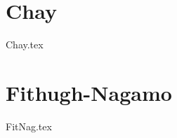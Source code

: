 \documentclass[../Orator.tex]{subfiles}
\begin{document}
\chapter{Chay}
{Chay.tex}


\chapter{Fithugh-Nagamo}
{FitNag.tex}
\end{document}
